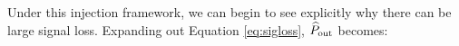 \documentclass[preprint2,numberedappendix,tighten]{aastex6}  %
\newcommand{\x}{\mathbf{x}}
\newcommand{\f}{\mathbf{f}}
\newcommand{\s}{\mathbf{s}}
\newcommand{\p}{\mathbf{p}}
\newcommand{\phat}{\widehat{\mathbf{p}}}
\newcommand{\cc}[1]{{\color{purple} \textbf{[CC: #1]}}}
\begin{document}

Under this injection framework, we can begin to see explicitly why there can be large signal loss. Expanding out Equation \eqref{eq:sigloss}, $\widehat{P}_{\rm out}$ becomes:

%
%
\end{document}
